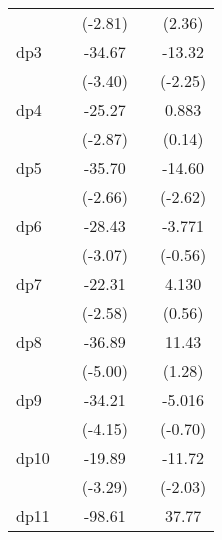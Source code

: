 {\begin{tabular}{l*{4}{c}}
            &                     &     (-2.81)         &                     &      (2.36)         \\
[1em]
dp3         &                     &      -34.67\sym{***}&                     &      -13.32\sym{*}  \\
            &                     &     (-3.40)         &                     &     (-2.25)         \\
[1em]
dp4         &                     &      -25.27\sym{**} &                     &       0.883         \\
            &                     &     (-2.87)         &                     &      (0.14)         \\
[1em]
dp5         &                     &      -35.70\sym{**} &                     &      -14.60\sym{**} \\
            &                     &     (-2.66)         &                     &     (-2.62)         \\
[1em]
dp6         &                     &      -28.43\sym{**} &                     &      -3.771         \\
            &                     &     (-3.07)         &                     &     (-0.56)         \\
[1em]
dp7         &                     &      -22.31\sym{*}  &                     &       4.130         \\
            &                     &     (-2.58)         &                     &      (0.56)         \\
[1em]
dp8         &                     &      -36.89\sym{***}&                     &       11.43         \\
            &                     &     (-5.00)         &                     &      (1.28)         \\
[1em]
dp9         &                     &      -34.21\sym{***}&                     &      -5.016         \\
            &                     &     (-4.15)         &                     &     (-0.70)         \\
[1em]
dp10        &                     &      -19.89\sym{**} &                     &      -11.72\sym{*}  \\
            &                     &     (-3.29)         &                     &     (-2.03)         \\
[1em]
dp11        &                     &      -98.61\sym{***}&                     &       37.77\sym{***}\\

\end{tabular}}
